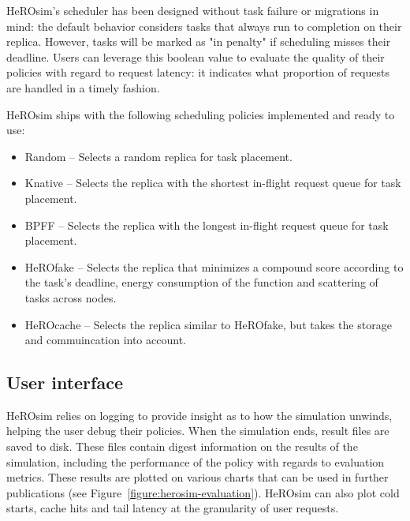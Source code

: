 HeROsim's scheduler has been designed without task failure or migrations in mind: the default behavior considers tasks that always run to completion on their replica. However, tasks will be marked as "in penalty" if scheduling misses their deadline. Users can leverage this boolean value to evaluate the quality of their policies with regard to request latency: it indicates what proportion of requests are handled in a timely fashion. 


HeROsim ships with the following scheduling policies implemented and ready to use:

\begin{itemize}
    \item Random -- Selects a random replica for task placement.
    \item Knative -- Selects the replica with the shortest in-flight request queue for task placement.
    \item BPFF -- Selects the replica with the longest in-flight request queue for task placement.
    \item HeROfake -- Selects the replica that minimizes a compound score according to the task's deadline, energy consumption of the function and scattering of tasks across nodes. %
    \item HeROcache -- Selects the replica similar to HeROfake, but takes the storage and commuincation into account. %
\end{itemize}


\subsection{User interface}

HeROsim relies on logging to provide insight as to how the simulation unwinds, helping the user debug their policies. When the simulation ends, result files are saved to disk. These files contain digest information on the results of the simulation, including the performance of the policy with regards to evaluation metrics. These results are plotted on various charts that can be used in further publications (see Figure~\ref{figure:herosim-evaluation}). HeROsim can also plot cold starts, cache hits and tail latency at the granularity of user requests. %

